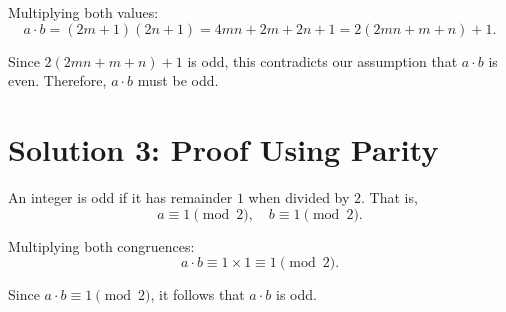 \documentclass{article}
\begin{document}
Multiplying both values:
\begin{equation}
    a \cdot b = (2m + 1)(2n + 1) = 4mn + 2m + 2n + 1 = 2(2mn + m + n) + 1.
\end{equation}

Since $2(2mn + m + n) + 1$ is odd, this contradicts our assumption that $a \cdot b$ is even. Therefore, $a \cdot b$ must be odd.

\section*{Solution 3: Proof Using Parity}
An integer is odd if it has remainder $1$ when divided by $2$. That is,
\begin{equation}
    a \equiv 1 \pmod{2}, \quad b \equiv 1 \pmod{2}.
\end{equation}

Multiplying both congruences:
\begin{equation}
    a \cdot b \equiv 1 \times 1 \equiv 1 \pmod{2}.
\end{equation}

Since $a \cdot b \equiv 1 \pmod{2}$, it follows that $a \cdot b$ is odd.
\end{document}
